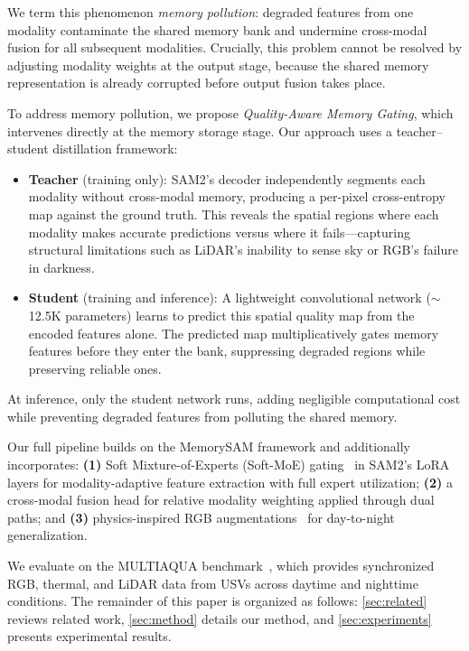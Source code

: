 We term this phenomenon \emph{memory pollution}: degraded features from one modality contaminate the shared memory bank and undermine cross-modal fusion for all subsequent modalities.
Crucially, this problem cannot be resolved by adjusting modality weights at the output stage, because the shared memory representation is already corrupted before output fusion takes place.

To address memory pollution, we propose \emph{Quality-Aware Memory Gating}, which intervenes directly at the memory storage stage.
Our approach uses a teacher--student distillation framework:
\begin{itemize}[nosep,leftmargin=*]
  \item \textbf{Teacher} (training only): SAM2's decoder independently segments each modality without cross-modal memory, producing a per-pixel cross-entropy map against the ground truth. This reveals the spatial regions where each modality makes accurate predictions versus where it fails---capturing structural limitations such as LiDAR's inability to sense sky or RGB's failure in darkness.
  \item \textbf{Student} (training and inference): A lightweight convolutional network (${\sim}$12.5K parameters) learns to predict this spatial quality map from the encoded features alone. The predicted map multiplicatively gates memory features before they enter the bank, suppressing degraded regions while preserving reliable ones.
\end{itemize}
At inference, only the student network runs, adding negligible computational cost while preventing degraded features from polluting the shared memory.

Our full pipeline builds on the MemorySAM framework and additionally incorporates:
\textbf{(1)} Soft Mixture-of-Experts (Soft-MoE) gating~\cite{puigcerver2024softmoe} in SAM2's LoRA~\cite{hu2022lora} layers for modality-adaptive feature extraction with full expert utilization;
\textbf{(2)} a cross-modal fusion head for relative modality weighting applied through dual paths;
and \textbf{(3)} physics-inspired RGB augmentations~\cite{muhovic2025multiaqua, shin2024crm} for day-to-night generalization.

We evaluate on the MULTIAQUA benchmark~\cite{muhovic2025multiaqua}, which provides synchronized RGB, thermal, and LiDAR data from USVs across daytime and nighttime conditions.
The remainder of this paper is organized as follows: \cref{sec:related} reviews related work, \cref{sec:method} details our method, and \cref{sec:experiments} presents experimental results.
